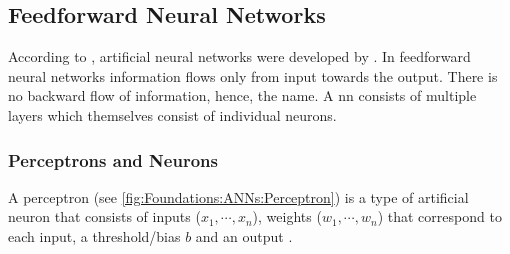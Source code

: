 \subsection{Feedforward Neural Networks}
\label{sec:Foundations:NeuralNetworks:FNN}

According to \textcite{nielsen2015neural}, artificial neural networks were developed by \textcite{rosenblatt1958perceptron}. In feedforward neural networks information flows only from input towards the output. There is no backward flow of information, hence, the name.
A \acf{nn} consists of multiple layers which themselves consist of individual neurons.

\subsubsection{Perceptrons and Neurons}
\label{sec:Foundations:NeuralNetworks:Perceptrons}

A perceptron (see \autoref{fig:Foundations:ANNs:Perceptron}) is a type of artificial neuron that consists of inputs ($x_1, \cdots, x_n$), weights ($w_1, \cdots, w_n$) that correspond to each input, a threshold/bias $b$ and an output \cite{nielsen2015neural}.


